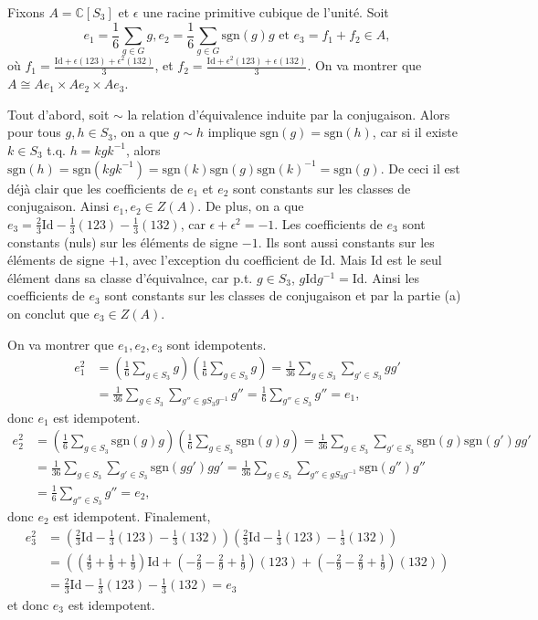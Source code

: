 \documentclass[french]{article}
\newcommand{\C}{\mathbb{C}}
\newcommand{\sgn}{\mathrm{sgn}}
\newcommand{\Id}{\mathrm{Id}}
\begin{document}
Fixons $A = \C[S_3]$ et $\epsilon$ une racine primitive cubique de
l'unité.
Soit
\begin{equation*}
	e_1 = \frac{1}{6}\sum_{g \in G} g,
	e_2 = \frac{1}{6}\sum_{g\in G} \sgn(g)g
	\text{ et }e_3 = f_1 + f_2 \in A,
\end{equation*}	
où $f_1 = \frac{\Id + \epsilon(123)
+ \epsilon^2(132)}{3}$, et $f_2 = \frac{\Id + \epsilon^2(123)
+ \epsilon (132)}{3}$.
On va montrer que $A \cong Ae_1 \times Ae_2 \times Ae_3$.

Tout d'abord, soit $\sim$ la relation d'équivalence induite par la
conjugaison. Alors pour tous $g, h \in S_3$, on a que $g \sim h$ implique
$\sgn(g) = \sgn(h)$, car si il existe $k \in S_3$ t.q. $h = kgk^{-1}$,
alors $\sgn(h) = \sgn(kgk^{-1}) = \sgn(k)\sgn(g)\sgn(k)^{-1} = \sgn(g)$.
De ceci il est déjà clair que les coefficients de $e_1$ et $e_2$ sont
constants sur les classes de conjugaison. Ainsi $e_1, e_2 \in Z(A)$.
De plus, on a que $e_3 = \frac{2}{3}\Id - \frac{1}{3}(123)
- \frac{1}{3}(132)$, car $\epsilon + \epsilon^2 = -1$.
Les coefficients de $e_3$ sont constants (nuls) sur les éléments
de signe $-1$. Ils sont aussi constants sur les éléments de signe
$+1$, avec l'exception du coefficient de $\Id$. Mais $\Id$ est le seul
élément dans sa classe d'équivalnce, car p.t. $g \in S_3$,
$g\Id g^{-1} = \Id$.
Ainsi les coefficients de $e_3$ sont constants sur les
classes de conjugaison et par la partie (a) on conclut que $e_3 \in Z(A)$.

On va montrer que $e_1, e_2, e_3$ sont idempotents.
\begin{align*}
	e_1^2 &= \left(\frac{1}{6}\sum_{g \in S_3} g\right)\left(\frac{1}{6}
	\sum_{g \in S_3} g\right)
	= \frac{1}{36}\sum_{g \in S_3}\sum_{g' \in S_3} gg'\\
	&= \frac{1}{36}\sum_{g \in S_3}\sum_{g'' \in gS_3g^{-1}} g''
	= \frac{1}{6}\sum_{g'' \in S_3} g'' = e_1,
\end{align*}
donc $e_1$ est idempotent.
\begin{align*}
	e_2^2 &= \left(\frac{1}{6}\sum_{g \in S_3} \sgn(g)g\right)\left(\frac{1}{6}
	\sum_{g \in S_3} \sgn(g)g\right)
	= \frac{1}{36}\sum_{g \in S_3}\sum_{g' \in S_3} \sgn(g)\sgn(g')gg'\\
	&= \frac{1}{36} \sum_{g \in S_3}\sum_{g'\in S_3} \sgn(gg') gg'
	= \frac{1}{36}\sum_{g \in S_3}\sum_{g'' \in gS_3g^{-1}} \sgn(g'')g'' \\
	&= \frac{1}{6} \sum_{g'' \in S_3} g'' = e_2,
\end{align*}
donc $e_2$ est idempotent. Finalement,
\begin{align*}
	e_3^2 &=
	\left(\frac{2}{3} \Id - \frac{1}{3} (123) - \frac{1}{3} (132)\right)
	\left(\frac{2}{3} \Id - \frac{1}{3} (123) - \frac{1}{3} (132)\right)\\
	&= \left(\left(\frac{4}{9} + \frac{1}{9} + \frac{1}{9}\right)\Id
	+ \left( - \frac{2}{9} - \frac{2}{9} + \frac{1}{9}\right)(123)
	+ \left( - \frac{2}{9} - \frac{2}{9} + \frac{1}{9}\right)(132)\right)\\
	&= 
	\frac{2}{3} \Id - \frac{1}{3} (123) - \frac{1}{3} (132) = e_3
\end{align*}
et donc $e_3$ est idempotent.
\end{document}
